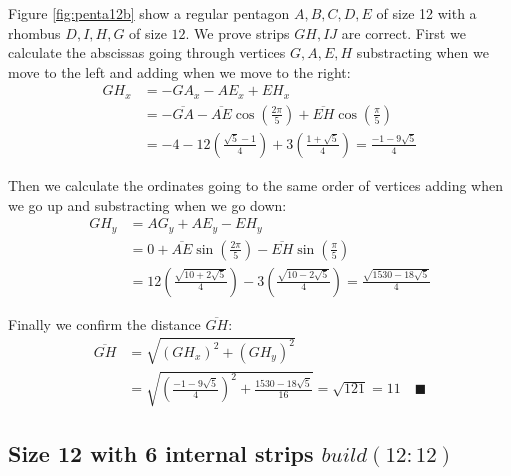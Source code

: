 \documentclass[11pt]{article}
\begin{document}
Figure \ref{fig:penta12b} show a regular pentagon $A,B,C,D,E$ of size 12 with a rhombus $D,I,H,G$ of size $12$. We prove strips $GH,IJ$ are correct. First we calculate the abscissas going through vertices $G,A,E,H$ substracting when we move to the left and adding when we move to the right:
\begin{align}
GH_x &= -GA_x - AE_x + EH_x\nonumber\\
 &= -\overline{GA} - \overline{AE}\cos\left(\frac{2\pi}5\right)
 +\overline{EH}\cos\left(\frac{\pi}5\right)\nonumber\\
 &= -4 - 12\left(\frac{\sqrt5 - 1}4\right) + 3\left(\frac{1+\sqrt5}4\right)
 = \frac{-1-9\sqrt5}4
\end{align}

Then we calculate the ordinates going to the same order of vertices adding when we go up and substracting when we go down:
\begin{align}
GH_y &= AG_y + AE_y - EH_y\nonumber\\
 &= 0 + \overline{AE}\sin\left(\frac{2\pi}5\right)
 - \overline{EH}\sin\left(\frac{\pi}5\right)\nonumber\\
 &= 12\left(\frac{\sqrt{10+2\sqrt5}}4\right)
 - 3\left(\frac{\sqrt{10-2\sqrt5}}4\right)%
 = \frac{\sqrt{1530-18\sqrt5}}4
\end{align}

Finally we confirm the distance $\overline{GH}$:
\begin{align}
\overline{GH} &= \sqrt{(GH_x)^2 + (GH_y)^2}\nonumber\\
 &= \sqrt{\left(\frac{-1-9\sqrt5}{4}\right)^2 + \frac{1530-18\sqrt5}{16}}%
 = \sqrt{121} = 11 \quad\blacksquare
\end{align}

\subsection{Size 12 with 6 internal strips $build(12:12)$}
\end{document}
